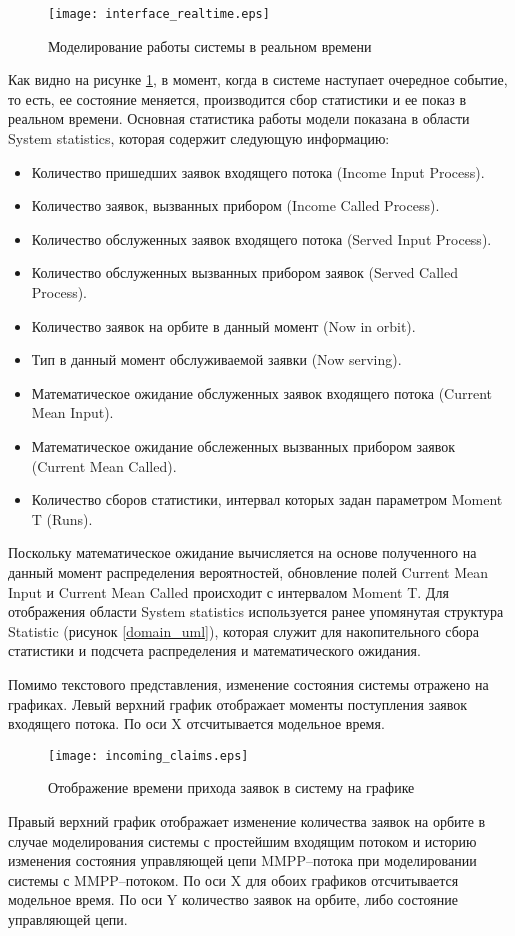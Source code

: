    \begin{figure}[H]
	\centering
	\texttt{[image: interface\_realtime.eps]}
	\caption{Моделирование работы системы в реальном времени}
	\label{interface_realtime}
\end{figure}
Как видно на рисунке \ref{interface_realtime}, в момент, когда в системе наступает очередное событие, то есть, ее состояние меняется, производится сбор статистики и ее показ в реальном времени. Основная статистика работы модели показана в области System statistics, которая содержит следующую информацию:
\begin{itemize}
	\item Количество пришедших заявок входящего потока (Income Input Process).
	\item Количество заявок, вызванных прибором (Income Called Process).
	\item Количество обслуженных заявок входящего потока (Served Input Process).
	\item Количество обслуженных вызванных прибором заявок (Served Called Process).
	\item Количество заявок на орбите в данный момент (Now in orbit).
	\item Тип в данный момент обслуживаемой заявки (Now serving).
	\item Математическое ожидание обслуженных заявок входящего потока (Current Mean Input).
	\item Математическое ожидание обслеженных вызванных прибором заявок (Current Mean Called).
	\item Количество сборов статистики, интервал которых задан параметром Moment T (Runs).
\end{itemize}
Поскольку математическое ожидание вычисляется на основе полученного на данный момент распределения вероятностей, обновление полей Current Mean Input и Current Mean Called происходит с интервалом Moment T. Для отображения области System statistics используется ранее упомянутая структура Statistic (рисунок \ref {domain_uml}), которая служит для накопительного сбора статистики и подсчета распределения и математического ожидания. 

Помимо текстового представления, изменение состояния системы отражено на графиках. Левый верхний график отображает моменты поступления заявок входящего потока. По оси X отсчитывается модельное время.
   \begin{figure}[H]
	\centering
	\texttt{[image: incoming\_claims.eps]}
	\caption{Отображение времени прихода заявок в систему на графике}
	\label{interface_incoming_claims}
\end{figure}
Правый верхний график отображает изменение количества заявок на орбите в случае моделирования системы с простейшим входящим потоком и историю изменения состояния управляющей цепи MMPP--потока при моделировании системы с MMPP--потоком. По оси X для обоих графиков отсчитывается модельное время. По оси Y количество заявок на орбите, либо состояние управляющей цепи.

